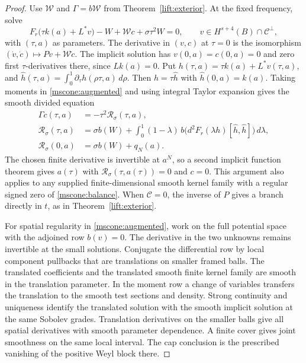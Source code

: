 \documentclass[11pt]{article}
\numberwithin{equation}{section}
\theoremstyle{definition}
\theoremstyle{remark}
\begin{document}
\begin{proof}
Use \(\mathcal W\) and \(\Gamma=b\mathcal W\) from
Theorem~\ref{lift:exterior}. At the fixed frequency, solve
\begin{equation}\label{mscone:augmented}
 F_r\big(\tau k(a)+L^*v\big)-W+\mathcal Wc+\sigma\tau^2W=0,
 \qquad v\in H^{s+4}(B)\cap\mathcal C^\perp ,
\end{equation}
with \((\tau,a)\) as parameters. The derivative in \((v,c)\)
at \(\tau=0\) is the isomorphism
\((\dot v,\dot c)\mapsto P\dot v+\mathcal W\dot c\).
The implicit solution has \(v(0,a)=c(0,a)=0\) and zero first
\(\tau\)-derivatives there, since \(Lk(a)=0\). Put
\(h(\tau,a)=\tau k(a)+L^*v(\tau,a)\), and
\(\widehat h(\tau,a)=\int_0^1\partial_\tau h(\rho\tau,a)\,d\rho\).
Then \(h=\tau\widehat h\) with \(\widehat h(0,a)=k(a)\). Taking
moments in \eqref{mscone:augmented} and using integral Taylor
expansion gives the smooth divided equation
\[
 \begin{aligned}
 \Gamma c(\tau,a)&=-\tau^2\mathcal R_\sigma(\tau,a),\\
 \mathcal R_\sigma(\tau,a)
 &=\sigma b(W)+\int_0^1(1-\lambda)\,
    b\big(d^2F_r(\lambda h)[\widehat h,\widehat h]\big)\,d\lambda,\\
 \mathcal R_\sigma(0,a)&=\sigma b(W)+q_N(a).
 \end{aligned}
\]
The chosen finite derivative is invertible at \(a^N\), so a
second implicit function theorem gives \(a(\tau)\) with
\(\mathcal R_\sigma(\tau,a(\tau))=0\) and \(c=0\). This argument
also applies to any supplied finite-dimensional smooth kernel
family with a regular signed zero of \eqref{mscone:balance}.
When \(\mathcal C=0\), the inverse of \(P\) gives a branch
directly in \(t\), as in Theorem~\ref{lift:exterior}.

For spatial regularity in \eqref{mscone:augmented}, work on
the full potential space with the adjoined row \(b(v)=0\).
The derivative in the two unknowns remains invertible at
the small solutions. Conjugate the differential row by local
component pullbacks that are translations on smaller framed balls.
The translated coefficients and the translated smooth finite kernel
family are smooth in the translation parameter. In the moment row
a change of variables transfers the translation to the smooth
test sections and density. Strong continuity and uniqueness identify
the translated solution with the smooth implicit solution at the
same Sobolev grades. Translation derivatives on the smaller balls
give all spatial derivatives with smooth parameter dependence.
A finite cover gives joint smoothness on the same local interval.
The cap conclusion is the prescribed vanishing of the positive Weyl
block there.
\end{proof}
\end{document}
